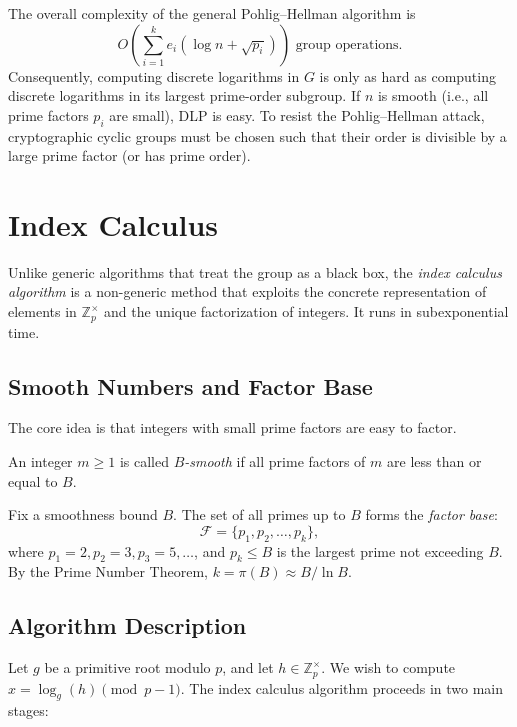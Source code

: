 \begin{remark}
    The overall complexity of the general Pohlig--Hellman algorithm is
    \[
        O\left( \sum_{i=1}^k e_i (\log n + \sqrt{p_i}) \right) \text{ group operations.}
    \]
    Consequently, computing discrete logarithms in \(G\) is only as hard as computing discrete logarithms in its largest prime-order subgroup.
    If \(n\) is smooth (i.e., all prime factors \(p_i\) are small), DLP is easy.
    To resist the Pohlig--Hellman attack, cryptographic cyclic groups must be chosen such that their order is divisible by a large prime factor (or has prime order).
\end{remark}

\section*{Index Calculus}

Unlike generic algorithms that treat the group as a black box, the \emph{index calculus algorithm} is a non-generic method that exploits the concrete representation of elements in \(\mathbb{Z}_p^\times\) and the unique factorization of integers.
It runs in subexponential time.

\subsection*{Smooth Numbers and Factor Base}

The core idea is that integers with small prime factors are easy to factor.

\begin{definition}
    An integer \(m \geq 1\) is called \emph{\(B\)-smooth} if all prime factors of \(m\) are less than or equal to \(B\).
\end{definition}

Fix a smoothness bound \(B\).
The set of all primes up to \(B\) forms the \emph{factor base}:
\[
    \mathcal{F} = \{p_1, p_2, \dots, p_k\},
\]
where \(p_1 = 2, p_2 = 3, p_3 = 5, \dots\), and \(p_k \leq B\) is the largest prime not exceeding \(B\).
By the Prime Number Theorem, \(k = \pi(B) \approx B / \ln B\).

\subsection*{Algorithm Description}

Let \(g\) be a primitive root modulo \(p\), and let \(h \in \mathbb{Z}_p^\times\).
We wish to compute \(x = \log_g(h) \pmod{p-1}\).
The index calculus algorithm proceeds in two main stages:

